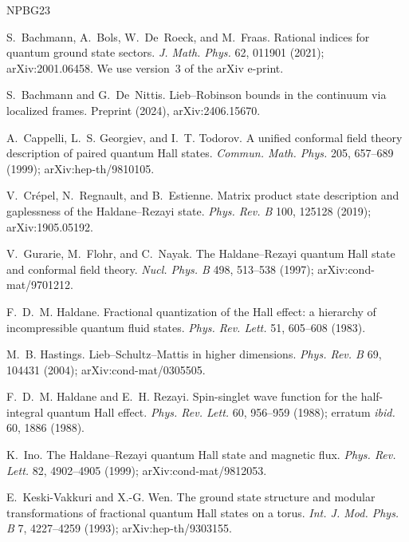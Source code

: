 \begin{thebibliography}{NPBG23}

S.~Bachmann, A.~Bols, W.~De~Roeck, and M.~Fraas.
\newblock Rational indices for quantum ground state sectors.
\newblock \emph{J. Math. Phys.} 62, 011901 (2021); arXiv:2001.06458. We use version~3 of the arXiv e-print.

S.~Bachmann and G.~De~Nittis.
\newblock Lieb--Robinson bounds in the continuum via localized frames.
\newblock Preprint (2024), arXiv:2406.15670.

A.~Cappelli, L.~S. Georgiev, and I.~T. Todorov.
\newblock A unified conformal field theory description of paired quantum Hall states.
\newblock \emph{Commun. Math. Phys.} 205, 657--689 (1999); arXiv:hep-th/9810105.

V.~Cr\'epel, N.~Regnault, and B.~Estienne.
\newblock Matrix product state description and gaplessness of the Haldane--Rezayi state.
\newblock \emph{Phys. Rev. B} 100, 125128 (2019); arXiv:1905.05192.

V.~Gurarie, M.~Flohr, and C.~Nayak.
\newblock The Haldane--Rezayi quantum Hall state and conformal field theory.
\newblock \emph{Nucl. Phys. B} 498, 513--538 (1997); arXiv:cond-mat/9701212.

F.~D.~M. Haldane.
\newblock Fractional quantization of the Hall effect: a hierarchy of incompressible quantum fluid states.
\newblock \emph{Phys. Rev. Lett.} 51, 605--608 (1983).

M.~B. Hastings.
\newblock Lieb--Schultz--Mattis in higher dimensions.
\newblock \emph{Phys. Rev. B} 69, 104431 (2004); arXiv:cond-mat/0305505.

F.~D.~M. Haldane and E.~H. Rezayi.
\newblock Spin-singlet wave function for the half-integral quantum Hall effect.
\newblock \emph{Phys. Rev. Lett.} 60, 956--959 (1988); erratum \emph{ibid.} 60, 1886 (1988).

K.~Ino.
\newblock The Haldane--Rezayi quantum Hall state and magnetic flux.
\newblock \emph{Phys. Rev. Lett.} 82, 4902--4905 (1999); arXiv:cond-mat/9812053.

E.~Keski-Vakkuri and X.-G. Wen.
\newblock The ground state structure and modular transformations of fractional quantum Hall states on a torus.
\newblock \emph{Int. J. Mod. Phys. B} 7, 4227--4259 (1993); arXiv:hep-th/9303155.


\end{thebibliography}
